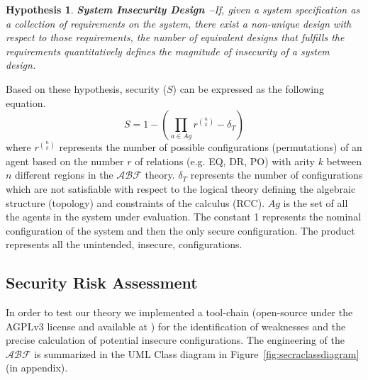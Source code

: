 \documentclass[conference]{IEEEtran}
\newcommand{\assertionRegion}{\mathcal{A}}
\newcommand{\beliefRegion}{\mathcal{B}}
\newcommand{\factRegion}{\mathcal{F}}
\newcommand{\abftheory}{\assertionRegion\beliefRegion\factRegion}
\newtheorem{hypothesis}{Hypothesis}%
\begin{document}
\begin{hypothesis}{\bf System Insecurity Design --}\label{hyp:insecurity}
	If, given a system specification as a collection of
	requirements on the system, there exist
	a non-unique design with respect to those requirements, the number of
	equivalent designs that fulfills the requirements quantitatively
	defines the magnitude of insecurity of a system design.
\end{hypothesis}

Based on these hypothesis, security ($S$) can be expressed as the following equation.
\begin{displaymath}
	S=1-(\prod_{a\in Ag} r^{\binom{n}{k}}-\delta_T)
\end{displaymath}
where $r^{\binom{n}{k}}$ represents the number of possible configurations (permutations) 
of an agent based on the number $r$ of relations (e.g. EQ, DR, PO) with arity $k$ between
$n$ different regions in the $\abftheory$ theory. $\delta_T$ represents the 
number of configurations which are not satisfiable with respect to the logical theory
defining the 
algebraic structure (topology) and constraints of the calculus (RCC). $Ag$ is the 
set of all the agents in the system under evaluation.
The constant 1 represents the nominal configuration of the system and then the
only secure configuration. The product represents all the unintended, insecure, configurations.

\subsection{Security Risk Assessment}\label{sec:secra}
In order to test our theory we implemented a tool-chain (open-source under the
AGPLv3 license and available at \autocite{v-research2020cybersecurity}) for the
identification of weaknesses and the precise calculation of potential insecure
configurations. The engineering of the $\abftheory$ is summarized in the UML
Class diagram in Figure~\ref{fig:secraclassdiagram} (in appendix). 
\end{document}
